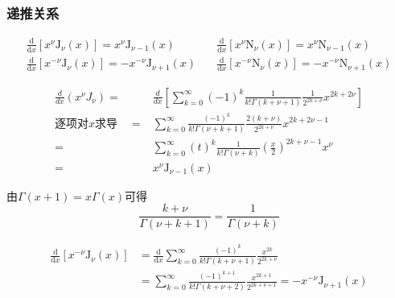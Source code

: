 \subsubsection{递推关系}
$$\boxed{
    \begin{array}{c}
        \frac{\mathrm{d}}{\mathrm{d}x}\left[x^\nu\mathrm{J}_\nu(x)\right]=x^\nu\mathrm{J}_{\nu-1}(x)\\
        \frac{\mathrm{d}}{\mathrm{d}x}\left[x^{-\nu}\mathrm{J}_\nu(x)\right]=-x^{-\nu}\mathrm{J}_{\nu+1}(x)
    \end{array}}
    \quad
    \boxed{
    \begin{array}{c}
        \frac{\mathrm{d}}{\mathrm{d}x}\left[x^\nu\mathrm{N}_\nu(x)\right]=x^\nu\mathrm{N}_{\nu-1}(x)\\
        \frac{\mathrm{d}}{\mathrm{d}x}\left[x^{-\nu}\mathrm{N}_\nu(x)\right]=-x^{-\nu}\mathrm{N}_{\nu+1}(x)
    \end{array}}$$
    


\begin{prf}[递推关系1]
    $$\begin{aligned}
    \frac{d}{dx}(x^{\nu}J_{\nu})=&\frac{d}{dx}\left[\sum_{k=0}^{\infty}(-1)^{k}\frac{1}{k!\Gamma(k+\nu+1)}\frac{1}{2^{2k+\nu}}x^{2k+2\nu}\right]\\
    \mbox{逐项对}x\mbox{求导}\quad=&\sum_{k=0}^{\infty}\frac{(-1)^{k}}{k!\Gamma(\nu+k+1)}\frac{2(k+\nu)}{2^{2k+\nu}}x^{2k+2\nu-1}\\
    =&\sum_{k=0}^{\infty}(t)^{k}\frac{1}{k!\Gamma(\nu+k)}\left(\frac{x}{2}\right)^{2k+\nu-1}x^{\nu}\\
    =&x^\nu\mathrm{J}_{\nu-1}(x)
    \end{aligned}$$

\begin{rem}
由$\Gamma(x+1)=x\Gamma(x)$可得
$$\frac{k+\nu}{\Gamma(\nu+k+1)}=\frac{1}{\Gamma(\nu+k)}$$
\end{rem}
\end{prf}

\begin{prf}[递推关系2]
    $$\begin{aligned}
        \frac{\mathrm{d}}{\mathrm{d}x}\left[x^{-\nu}\mathrm{J}_\nu(x)\right]
        &=\frac{\mathrm{d}}{\mathrm{d}x}\sum_{k=0}^\infty\frac{(-1)^k}{k! \Gamma\left(k+\nu+1\right)}\frac{x^{2k}}{2^{2k+\nu}}\\
        &=\sum_{k=0}^\infty\frac{(-1)^{k+1}}{k! \Gamma\left(k+\nu+2\right)}\frac{x^{2k+1}}{2^{2k+\nu+1}}
        =-x^{-\nu}\mathrm{J}_{\nu+1}(x)
    \end{aligned}$$
\end{prf}


